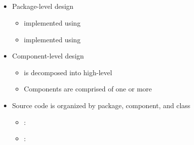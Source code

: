 \NEWSEC

\subsection{\ssOop}

\begin{frame}[fragile,label=ss-oop] 
\secframetitle{\ssOop}

\begin{itemize}
\item Package-level design
\begin{itemize}
\item {}  implemented using  
\item {} implemented using  
\end{itemize}
\item Component-level design
\begin{itemize}
\item {} is decomposed into high-level 
\item Components are comprised of one or more 
\end{itemize}
\item Source code is organized by package, component, and class
\begin{itemize}
\footnotesize
\item {}:
\item {}:
\end{itemize}
\end{itemize}

\end{frame}


